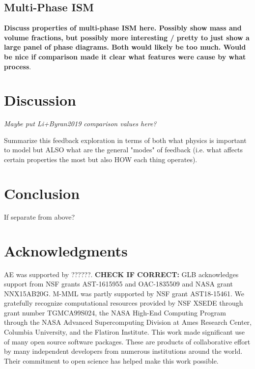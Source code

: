 \documentclass[twocolumn]{aastex62}
\begin{document}
\subsection{Multi-Phase ISM}
\textbf{Discuss properties of multi-phase ISM here. Possibly show mass and volume fractions, but possibly more interesting / pretty to just show a large panel of phase diagrams. Both would likely be too much. Would be nice if comparison made it clear what features were cause by what process}.




\section{Discussion}

\textit{Maybe put Li+Byran2019 comparison values here?}

Summarize this feedback exploration in terms of both what physics is important to model but ALSO what are the general "modes" of feedback (i.e. what affects certain properties the most but also HOW each thing operates). 


\section{Conclusion}
If separate from above?

\section*{Acknowledgments} AE was supported by ??????. \textbf{CHECK IF CORRECT:} GLB acknowledges support from NSF grants AST-1615955 and OAC-1835509 and NASA grant NNX15AB20G. M-MML was partly supported by NSF grant AST18-15461. We gratefully recognize computational resources provided by NSF XSEDE through grant number TGMCA99S024, the NASA High-End Computing Program through the NASA Advanced Supercomputing Division at Ames Research Center, Columbia University, and the Flatiron Institute. This work made significant use of many open source software packages. These are products of collaborative effort by many independent developers from numerous institutions around the world. Their commitment to open science has helped make this work possible. 

\end{document}
